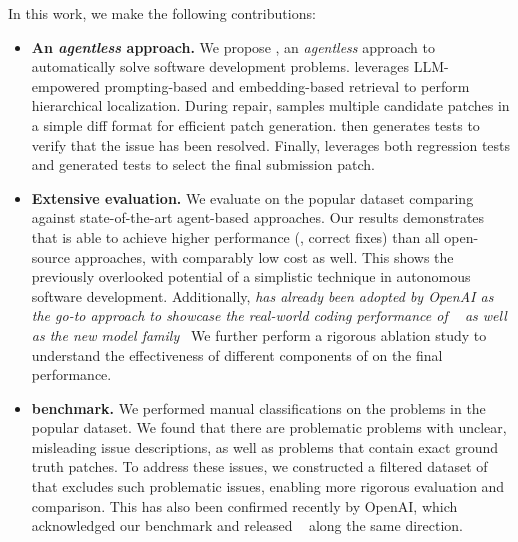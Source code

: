  In this work, we make the following contributions:

\begin{itemize}[noitemsep, leftmargin=*, topsep=0pt]
 \item \textbf{An \emph{agentless} approach.} We propose \tech, an \emph{agentless} approach to automatically solve software development problems.
 \tech leverages LLM-empowered prompting-based and embedding-based retrieval to perform hierarchical localization.
 During repair, \tech{} samples multiple candidate patches in a simple diff format for efficient patch generation.
 \tech{} {then} generates \reproduction tests to verify {that} the issue has been resolved. 
 Finally, \tech leverages both regression {tests} and generated \reproduction tests to select the final submission patch.
 \item \textbf{Extensive evaluation.} We evaluate \tech on the popular \swebenchlite dataset comparing against state-of-the-art agent-based approaches. 
 Our results demonstrates that \tech is able to achieve higher performance  (\totalsolveperc{}, \totalsolve correct fixes) than all open-source approaches, with comparably low cost as well.
 This shows the previously overlooked potential of a simplistic technique in autonomous software development. 
 Additionally, \emph{\tech has already been adopted by OpenAI as the go-to approach to showcase the real-world coding performance of \gptfouro~\cite{openaiverified} as well as the new \oone model family~\cite{openaioonesystemcard}}
 We further perform a rigorous ablation study to understand the effectiveness of different components of \tech on the final performance.
 \item \textbf{\swebenchlitefiltered{} benchmark.} We performed manual classifications on the problems in the popular \swebenchlite dataset.
 We found that there are problematic problems with unclear, misleading issue descriptions, as well as problems that contain exact ground truth patches. 
 To address these issues, we constructed a filtered dataset of \swebenchlitefiltered{} that excludes such problematic issues{, enabling} more rigorous evaluation and comparison. 
 This has also been confirmed recently by OpenAI, which acknowledged our benchmark and released \swebenchverified~\cite{openaiverified} along the same direction.
\end{itemize}

